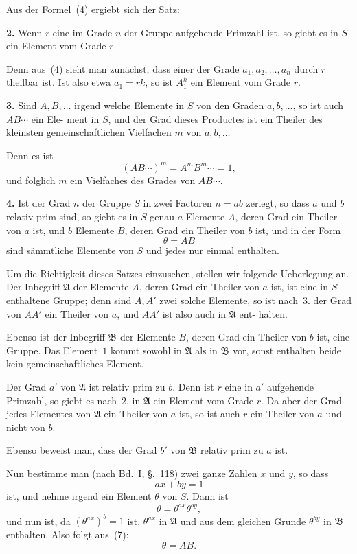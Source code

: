 \documentclass[12pt,a4paper]{article}
\theoremstyle{plain}
\theoremstyle{definition}
\theoremstyle{remark}
\begin{document}
Aus der Formel~(4) ergiebt sich der Satz:

\textbf{2.} Wenn $r$ eine im Grade $n$ der Gruppe aufgehende
Primzahl ist, so giebt es in $S$ ein Element vom
Grade $r$.

Denn aus~(4) sieht man zunächst, dass einer der Grade
$a_1, a_2, \ldots, a_n$ durch $r$ theilbar ist. Ist also etwa $a_1 = rk$, so
ist $A_1^k$ ein Element vom Grade $r$.

\textbf{3.} Sind $A, B, \ldots$ irgend welche Elemente in $S$ von
den Graden $a, b, \ldots$, so ist auch $AB \cdots$ ein Ele-
ment in $S$, und der Grad dieses Productes ist
ein Theiler des kleinsten gemeinschaftlichen
Vielfachen $m$ von $a, b, \ldots$

Denn es ist
\[
(AB \cdots)^m = A^m B^m \cdots = 1,
\]
und folglich $m$ ein Vielfaches des Grades von $AB \cdots$.

\textbf{4.} Ist der Grad $n$ der Gruppe $S$ in zwei Factoren
$n = ab$ zerlegt, so dass $a$ und $b$ relativ prim
sind, so giebt es in $S$ genau $a$ Elemente $A$, deren
Grad ein Theiler von $a$ ist, und $b$ Elemente $B$,
deren Grad ein Theiler von $b$ ist, und in der
Form
\begin{equation}\tag{5}
\theta = AB
\end{equation}
sind sämmtliche Elemente von $S$ und jedes nur
einmal enthalten.

Um die Richtigkeit dieses Satzes einzusehen, stellen wir
folgende Ueberlegung an. Der Inbegriff $\mathfrak{A}$ der Elemente $A$, deren
Grad ein Theiler von $a$ ist, ist eine in $S$ enthaltene Gruppe;
denn sind $A, A'$ zwei solche Elemente, so ist nach~3. der Grad
von $AA'$ ein Theiler von $a$, und $AA'$ ist also auch in $\mathfrak{A}$ ent-
halten.

Ebenso ist der Inbegriff $\mathfrak{B}$ der Elemente $B$, deren Grad ein
Theiler von $b$ ist, eine Gruppe. Das Element~$1$ kommt sowohl
in $\mathfrak{A}$ als in $\mathfrak{B}$ vor, sonst enthalten beide kein gemeinschaftliches
Element.

Der Grad $a'$ von $\mathfrak{A}$ ist relativ prim zu $b$. Denn ist $r$ eine
in $a'$ aufgehende Primzahl, so giebt es nach~2. in $\mathfrak{A}$ ein Element
vom Grade $r$. Da aber der Grad jedes Elementes von $\mathfrak{A}$ ein
Theiler von $a$ ist, so ist auch $r$ ein Theiler von $a$ und nicht
von $b$.

Ebenso beweist man, dass der Grad $b'$ von $\mathfrak{B}$ relativ prim
zu $a$ ist.

Nun bestimme man (nach Bd.~I, \S.~118) zwei ganze Zahlen
$x$ und $y$, so dass
\begin{equation}\tag{6}
ax + by = 1
\end{equation}
ist, und nehme irgend ein Element $\theta$ von $S$. Dann ist
\begin{equation}\tag{7}
\theta = \theta^{ax} \theta^{by},
\end{equation}
und nun ist, da $(\theta^{ax})^b = 1$ ist, $\theta^{ax}$ in $\mathfrak{A}$ und aus dem gleichen
Grunde $\theta^{by}$ in $\mathfrak{B}$ enthalten. Also folgt aus~(7):
\begin{equation}\tag{8}
\theta = AB.
\end{equation}
\end{document}
